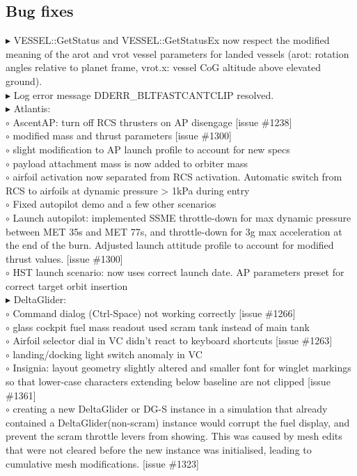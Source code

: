 \documentclass[Orbiter User Manual.tex]{subfiles}
\begin{document}
\subsection{Bug fixes}
$\blacktriangleright$ VESSEL::GetStatus and VESSEL::GetStatusEx now respect the modified meaning of the arot and vrot vessel parameters for landed vessels (arot: rotation angles relative to planet frame, vrot.x: vessel CoG altitude above elevated ground).\\
$\blacktriangleright$ Log error message DDERR\_BLTFASTCANTCLIP resolved.\\
$\blacktriangleright$ Atlantis:\\
$\circ$ AscentAP: turn off RCS thrusters on AP disengage [issue \#1238]\\
$\circ$ modified mass and thrust parameters [issue \#1300]\\
$\circ$ slight modification to AP launch profile to account for new specs\\
$\circ$ payload attachment mass is now added to orbiter mass\\
$\circ$ airfoil activation now separated from RCS activation. Automatic switch from RCS to airfoils at dynamic pressure > 1kPa during entry\\
$\circ$ Fixed autopilot demo and a few other scenarios\\
$\circ$ Launch autopilot: implemented SSME throttle-down for max dynamic pressure between MET 35s and MET 77s, and throttle-down for 3g max acceleration at the end of the burn. Adjusted launch attitude profile to account for modified thrust values. [issue \#1300]\\
$\circ$ HST launch scenario: now uses correct launch date. AP parameters preset for correct target orbit insertion\\
$\blacktriangleright$ DeltaGlider:\\
$\circ$ Command dialog (Ctrl-Space) not working correctly [issue \#1266]\\
$\circ$ glass cockpit fuel mass readout used scram tank instead of main tank\\
$\circ$ Airfoil selector dial in VC didn't react to keyboard shortcuts [issue \#1263]\\
$\circ$ landing/docking light switch anomaly in VC\\
$\circ$ Insignia: layout geometry slightly altered and smaller font for winglet markings so that lower-case characters extending below baseline are not clipped [issue \#1361]\\
$\circ$ creating a new DeltaGlider or DG-S instance in a simulation that already contained a DeltaGlider(non-scram) instance would corrupt the fuel display, and prevent the scram throttle levers from showing. This was caused by mesh edits that were not cleared before the new instance was initialised, leading to cumulative mesh modifications. [issue \#1323]\\
\end{document}
